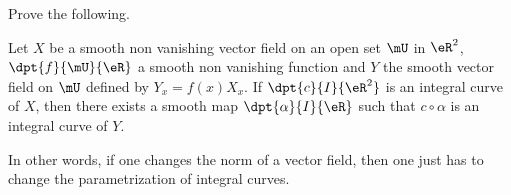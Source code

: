 \begin{exercice}\label{exo010}

Prove the following.

\begin{lemma}\label{lem_XYparall}

Let $X$ be a smooth non vanishing vector field on an open set $\mU$ in $\eR^2$, $\dpt{ f }{ \mU }{ \eR }$ a smooth non vanishing function and $Y$ the smooth vector field on $\mU$ defined by $Y_x=f(x)X_x$. If $\dpt{ c }{ I }{ \eR^2 }$ is an integral curve of $X$, then there exists a smooth map $\dpt{ \alpha }{ I }{ \eR }$ such that $c\circ\alpha$ is an integral curve of $Y$.

In other words, if one changes the norm of a vector field, then one just has to change the parametrization of integral curves.
\end{lemma}


\end{exercice}

